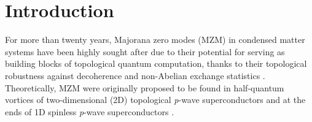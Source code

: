 \documentclass[aps,prb,showpacs,amsmath,twocolumn,amssymb,superscriptaddress]{revtex4-2}
\begin{document}
\section{Introduction}
For more than twenty years, Majorana zero modes (MZM) in condensed matter systems have been highly sought after due to their potential for serving as building blocks of topological quantum computation, thanks to their topological robustness against decoherence and non-Abelian exchange statistics \cite{ivanovNonAbelianStatisticsHalfQuantum2001, kitaevFaulttolerantQuantumComputation2003, nayakNonAbelianAnyonsTopological2008, aliceaNonAbelianStatisticsTopological2011, aasenMilestonesMajoranaBasedQuantum2016}. Theoretically, MZM were originally proposed to be found in half-quantum vortices of two-dimensional (2D) topological \textit{p}-wave superconductors and at the ends of 1D spinless \textit{p}-wave superconductors \cite{readPairedStatesFermions2000, kitaevUnpairedMajoranaFermions2001}.
\end{document}
